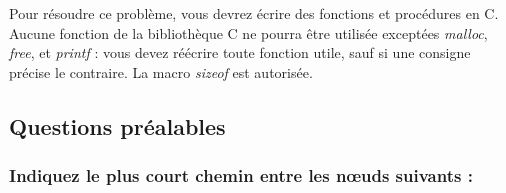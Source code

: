 \documentclass[11pt,a4paper]{article}
\begin{document}
\medskip

Pour résoudre ce problème, vous devrez écrire des fonctions et procédures en C.
Aucune fonction de la bibliothèque C ne pourra être utilisée exceptées \textit{malloc}, \textit{free}, et \textit{printf} : vous devez réécrire toute fonction utile, sauf si une consigne précise le contraire.
La macro \textit{sizeof} est autorisée.

\medskip


\subsection{Questions préalables}

\subsubsection{Indiquez le plus court chemin entre les nœuds suivants : }

\begin{center}
\end{center}
\end{document}
